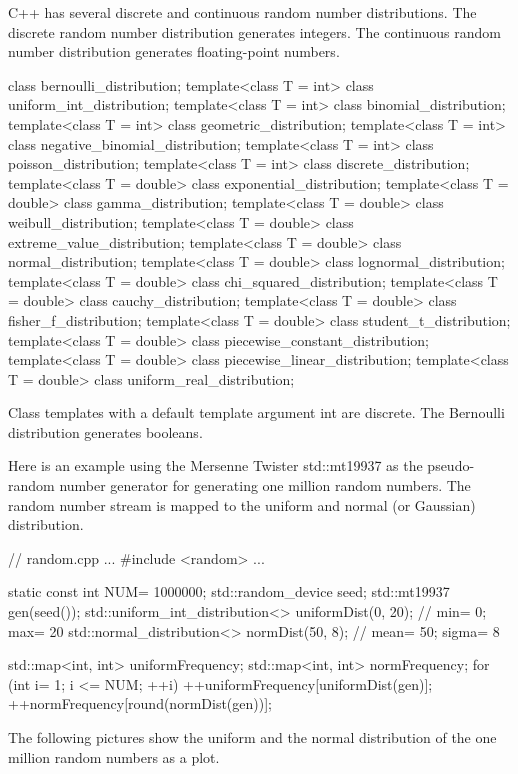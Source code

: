 C++ has several discrete and continuous random number distributions. The discrete random number distribution generates integers. The continuous random number distribution generates floating-point numbers.

\begin{cpp}
class bernoulli_distribution;
template<class T = int> class uniform_int_distribution;
template<class T = int> class binomial_distribution;
template<class T = int> class geometric_distribution;
template<class T = int> class negative_binomial_distribution;
template<class T = int> class poisson_distribution;
template<class T = int> class discrete_distribution;
template<class T = double> class exponential_distribution;
template<class T = double> class gamma_distribution;
template<class T = double> class weibull_distribution;
template<class T = double> class extreme_value_distribution;
template<class T = double> class normal_distribution;
template<class T = double> class lognormal_distribution;
template<class T = double> class chi_squared_distribution;
template<class T = double> class cauchy_distribution;
template<class T = double> class fisher_f_distribution;
template<class T = double> class student_t_distribution;
template<class T = double> class piecewise_constant_distribution;
template<class T = double> class piecewise_linear_distribution;
template<class T = double> class uniform_real_distribution;
\end{cpp}

Class templates with a default template argument int are discrete. The Bernoulli distribution generates booleans.

Here is an example using the Mersenne Twister std::mt19937 as the pseudo-random number generator for generating one million random numbers. The random number stream is mapped to the uniform and normal (or Gaussian) distribution.


\begin{cpp}
// random.cpp
...
#include <random>
...

static const int NUM= 1000000;
std::random_device seed;
std::mt19937 gen(seed());
std::uniform_int_distribution<> uniformDist(0, 20); // min= 0; max= 20
std::normal_distribution<> normDist(50, 8); // mean= 50; sigma= 8

std::map<int, int> uniformFrequency;
std::map<int, int> normFrequency;
for (int i= 1; i <= NUM; ++i){
	++uniformFrequency[uniformDist(gen)];
	++normFrequency[round(normDist(gen))];
}
\end{cpp}

The following pictures show the uniform and the normal distribution of the one million random numbers as a plot.












